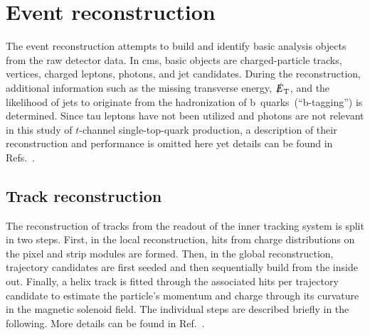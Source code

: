 \chapter{Event reconstruction}
\label{ch:reconstruction}


The event reconstruction attempts to build and identify basic analysis objects from the raw detector data. In \gls{cms}, basic objects are charged-particle tracks, vertices, charged leptons, photons, and jet candidates. During the reconstruction, additional information such as the missing transverse energy, $\slashed{E}_{\textrm{T}}$, and the likelihood of jets to originate from the hadronization of b~quarks~(``b-tagging'') is determined. Since tau leptons have not been utilized and photons are not relevant in this study of $t$-channel single-top-quark production, a description of their reconstruction and performance is omitted here yet details can be found in Refs.~\cite{Khachatryan:2015dfa,Khachatryan:2015iwa}.


\section{Track reconstruction}
\label{sec:reconstruction-track}

The reconstruction of tracks from the readout of the inner tracking system is split in two steps. First, in the local reconstruction, hits from charge distributions on the pixel and strip modules are formed. Then, in the global reconstruction, trajectory candidates are first seeded and then sequentially build from the inside out. Finally, a helix track is fitted through the associated hits per trajectory candidate to estimate the particle's momentum and charge through its curvature in the magnetic solenoid field. The individual steps are described briefly in the following. More details can be found in Ref.~\cite{Chatrchyan:2014fea}.

